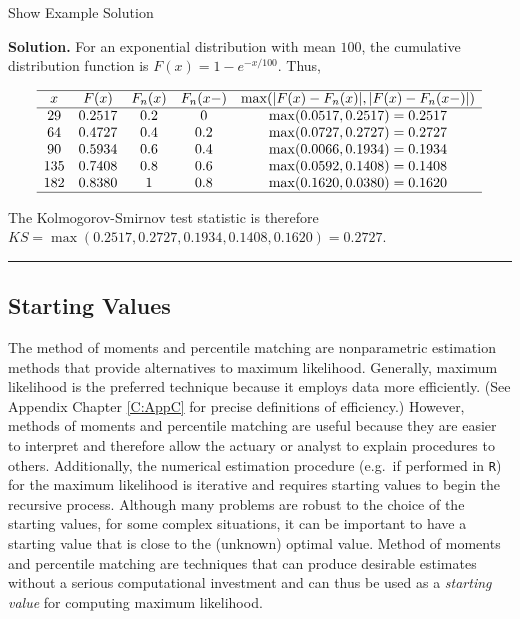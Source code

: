 \documentclass[]{book}
\theoremstyle{definition}
\theoremstyle{definition}
\theoremstyle{definition}
\theoremstyle{remark}
\begin{document}
Show Example Solution

\hypertarget{toggleExampleSelect.1.7}{}
\textbf{Solution.} For an exponential distribution with mean \(100\),
the cumulative distribution function is \(F(x)=1-e^{-x/100}\). Thus,

\[\begin{array}{ccccc}
\hline
x & F(x) & F_n(x) & F_n(x-) & \max(|F(x)-F_n(x)|,|F(x)-F_n(x-)|) \\
\hline
29  & 0.2517 & 0.2 & 0   & \max(0.0517, 0.2517) = 0.2517 \\
64  & 0.4727 & 0.4 & 0.2 & \max(0.0727, 0.2727) = 0.2727 \\
90  & 0.5934 & 0.6 & 0.4 & \max(0.0066, 0.1934) = 0.1934 \\
135 & 0.7408 & 0.8 & 0.6 & \max(0.0592, 0.1408) = 0.1408 \\
182 & 0.8380 & 1   & 0.8 & \max(0.1620, 0.0380) = 0.1620 \\
\hline
\end{array}\]

The Kolmogorov-Smirnov test statistic is therefore
\(KS = \max(0.2517, 0.2727, 0.1934, 0.1408, 0.1620) = 0.2727\).

\begin{center}\rule{0.5\linewidth}{\linethickness}\end{center}

\subsection{Starting Values}\label{starting-values}

The method of moments and percentile matching are nonparametric
estimation methods that provide alternatives to maximum likelihood.
Generally, maximum likelihood is the preferred technique because it
employs data more efficiently. (See Appendix Chapter \ref{C:AppC} for
precise definitions of efficiency.) However, methods of moments and
percentile matching are useful because they are easier to interpret and
therefore allow the actuary or analyst to explain procedures to others.
Additionally, the numerical estimation procedure (e.g.~if performed in
\texttt{R}) for the maximum likelihood is iterative and requires
starting values to begin the recursive process. Although many problems
are robust to the choice of the starting values, for some complex
situations, it can be important to have a starting value that is close
to the (unknown) optimal value. Method of moments and percentile
matching are techniques that can produce desirable estimates without a
serious computational investment and can thus be used as a
\emph{starting value} for computing maximum likelihood.
\end{document}
